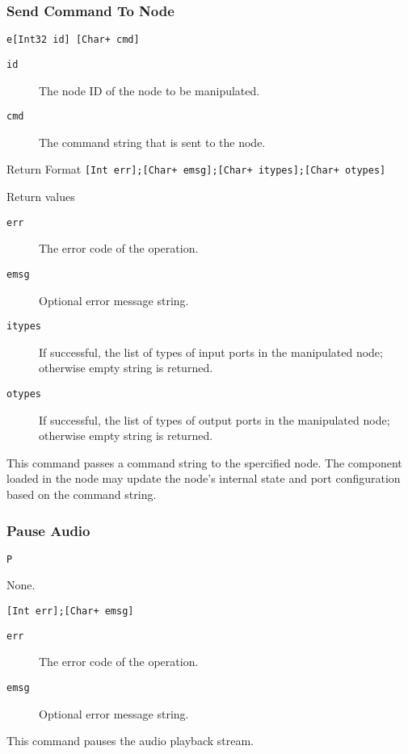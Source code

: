 \documentclass{report}
\newcommand{\inlinecode}[1]{\begin{mdframed}[backgroundcolor=black!10]#1\end{mdframed}}
\begin{document}
\subsubsection{Send Command To Node}
\inlinecode{
\begin{description}\sloppy
\item[Command Format] \lstinline{e[Int32 id] [Char+ cmd]}
\item[Command Arguments]\hfill
  \begin{description}
  \item[\texttt{id}] The node ID of the node to be manipulated.
  \item[\texttt{cmd}] The command string that is sent to the node.
  \end{description}
\item[Return Format] \lstinline|[Int err];[Char+ emsg];[Char+ itypes];[Char+ otypes]|
\item[Return values]\hfill
  \begin{description}
  \item[\texttt{err}] The error code of the operation.
  \item[\texttt{emsg}] Optional error message string.
  \item[\texttt{itypes}] If successful, the list of types of input ports in the manipulated node; otherwise empty string is returned.
  \item[\texttt{otypes}] If successful, the list of types of output ports in the manipulated node; otherwise empty string is returned.
  \end{description}
\end{description}}\par
This command passes a command string to the spercified node. The component loaded in the node may update the node's internal state and port configuration based on the command string.
\subsubsection{Pause Audio}
\inlinecode{
\begin{description}\sloppy
\item[Command Format] \lstinline{P}
\item[Command Arguments] None.
\item[Return Format] \lstinline|[Int err];[Char+ emsg]|
\item[Return values]\hfill
  \begin{description}
  \item[\texttt{err}] The error code of the operation.
  \item[\texttt{emsg}] Optional error message string.
  \end{description}
\end{description}}\par
This command pauses the audio playback stream.
\end{document}

